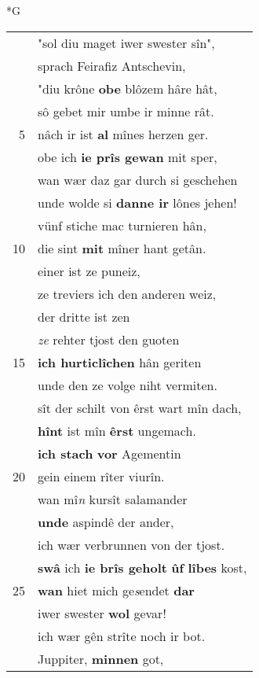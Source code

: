 \documentclass[8pt,a4paper,notitlepage]{article}
\begin{document}
\newpage
\begin{table}[ht]
\begin{minipage}[t]{0.5\linewidth}
\small
\begin{center}*G
\end{center}
\begin{tabular}{rl}
 & "sol diu maget iwer swester sîn",\\ 
 & sprach Feirafiz Antschevin,\\ 
 & "diu krône \textbf{obe} blôzem hâre hât,\\ 
 & sô gebet mir umbe ir minne rât.\\ 
5 & nâch ir ist \textbf{al} mînes herzen ger.\\ 
 & obe ich \textbf{ie prîs gewan} mit sper,\\ 
 & wan wær daz gar durch si geschehen\\ 
 & unde wolde si \textbf{danne ir} lônes jehen!\\ 
 & vünf stiche mac turnieren hân,\\ 
10 & die sint \textbf{mit} mîner hant getân.\\ 
 & einer ist ze puneiz,\\ 
 & ze treviers ich den anderen weiz,\\ 
 & der dritte ist zen \\ 
 & \textit{ze} rehter tjost den guoten\\ 
15 & \textbf{ich hurticlîchen} hân geriten\\ 
 & unde den ze volge niht vermiten.\\ 
 & sît der schilt von êrst wart mîn dach,\\ 
 & \textbf{hînt} ist mîn \textbf{êrst} ungemach.\\ 
 & \textbf{ich stach} \textbf{vor} Agementin\\ 
20 & gein einem rîter viurîn.\\ 
 & wan mî\textit{n} kursît salamander\\ 
 & \textbf{unde} aspindê der ander,\\ 
 & ich wær verbrunnen von der tjost.\\ 
 & \textbf{swâ} ich \textbf{ie brîs geholt} \textbf{ûf} \textbf{lîbes} kost,\\ 
25 & \textbf{wan} hiet mich ge\textit{s}endet \textbf{dar}\\ 
 & iwer swester \textbf{wol} gevar!\\ 
 & ich wær gên strîte noch ir bot.\\ 
 & Juppiter, \textbf{minnen} got,\\ 

\end{tabular}
\end{minipage}
\end{table}
\end{document}
